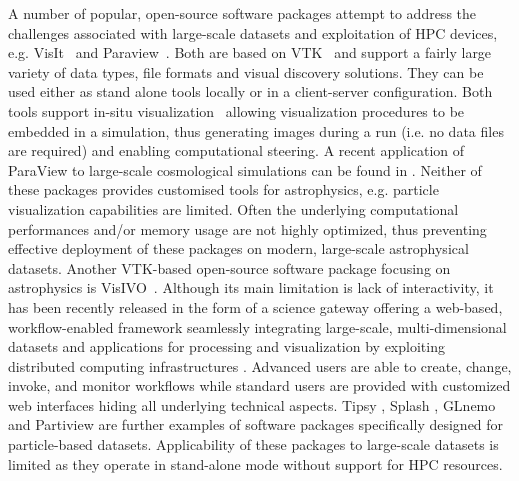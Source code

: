 \documentclass[1p]{elsarticle}
\begin{document}
A number of popular, open-source software packages attempt to address the challenges associated with large-scale datasets and exploitation of HPC devices, e.g. VisIt~\cite{visit} and Paraview~\cite{paraview}. Both are based on VTK~\cite{vtk} and support a fairly large variety of data types, file formats and visual discovery solutions. They can be used either as stand alone tools locally or in a client-server configuration. Both tools support in-situ visualization~\cite{in-situ} allowing visualization procedures to be embedded in a simulation, thus generating images during a run (i.e. no data files are required) and enabling computational steering. A recent application of ParaView to large-scale cosmological simulations can be found in \cite{2011ApJS..195...11W}. Neither of these packages provides customised tools for astrophysics,  e.g. particle visualization capabilities are limited. Often the underlying computational performances and/or memory usage are not highly optimized, thus preventing effective deployment of these packages on modern, large-scale astrophysical datasets. Another VTK-based open-source software package focusing on astrophysics is VisIVO~\cite{visivo}. Although its main limitation is lack of interactivity, it has been recently released in the form of a science gateway offering a web-based, workflow-enabled framework seamlessly integrating large-scale, multi-dimensional datasets and applications for processing and visualization by exploiting distributed computing infrastructures \cite{VisIVOGateway}. Advanced users are able to create, change, invoke, and monitor workflows while standard users are provided with customized web interfaces hiding all underlying technical aspects. Tipsy \cite{tipsyurl}, Splash \cite{splash}, GLnemo \cite{glnemo} and Partiview \cite{partiview} are further examples of software packages specifically designed for particle-based datasets. Applicability of these packages to large-scale datasets is limited as they operate in stand-alone mode without support for HPC resources.
\end{document}
